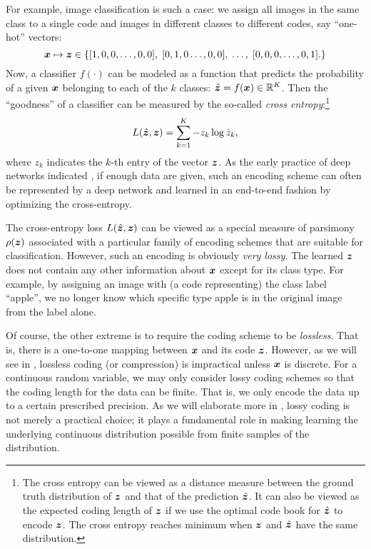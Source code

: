 \documentclass[../../book-main.tex]{subfiles}
\begin{document}
\begin{example}
For example, image classification is such a case: we assign all images in the same class to a single code and images in different classes to different codes, say ``one-hot'' vectors:
\begin{equation}
  \bm{x} \mapsto \bm{z} \in \{  [1, 0, 0, \ldots , 0, 0], \;  [0, 1, 0 \ldots, 0, 0], \; \ldots, \;  [0,0,0, \ldots, 0, 1].\}
  \label{eqn:class-labels}
\end{equation}
Now, a classifier $f(\cdot)$ can be modeled as a function that predicts the probability of a given $\bm{x}$ belonging to each of the $k$ classes: $\hat{\bm{z}} = f(\bm{x}) \in \mathbb{R}^K$. Then the ``goodness'' of a classifier can be measured by the so-called {\em cross entropy}:\footnote{The cross entropy can be viewed as a distance measure between the ground truth distribution of $\bm{z}$ and that of the prediction $\hat{\bm{z}}$. It can also be viewed as the expected coding length of $\bm{z}$ if we use the optimal code book for $\hat {\bm{z}}$ to encode $\bm{z}$. The cross entropy reaches minimum when $\bm{z}$ and $\hat {\bm{z}}$ have the same distribution.}
\begin{equation}
    L(\hat{\bm{z}}, \bm{z}) = \sum_{k=1}^K - z_k \log \hat{z}_k,
\end{equation}
where $z_k$ indicates the $k$-th entry of the vector $\bm{z}$. As the early practice of deep networks indicated \cite{krizhevsky2012imagenet}, if enough data are given, such an encoding scheme can often be represented by a deep network and learned in an end-to-end fashion by optimizing the cross-entropy. 
\end{example}

The cross-entropy loss $L(\hat {\bm{z}}, \bm{z})$ can be viewed as a special measure of parsimony $\rho(\bm{z})$ associated with a particular family of encoding schemes that are suitable for classification. However, such an encoding is obviously {\em very lossy}. The learned $\bm{z}$ does not contain any other information about $\bm{x}$ except for its class type. For example, by assigning an image with (a code representing) the class label ``apple'', we no longer know which specific type apple is in the original image from the label alone. 

Of course, the other extreme is to require the coding scheme to be {\em lossless}. That is, there is a one-to-one mapping between $\bm{x}$ and its code $\bm{z}$. However, as we will see in , lossless coding (or compression) is impractical unless $\bm{x}$ is discrete. For a continuous random variable, we may only consider lossy coding schemes so that the coding length for the data can be finite. That is, we only encode the data up to a certain prescribed precision. As we will elaborate more in , lossy coding is not merely a practical choice; it plays a fundamental role in making learning the underlying continuous distribution possible from finite samples of the distribution. 
\end{document}
